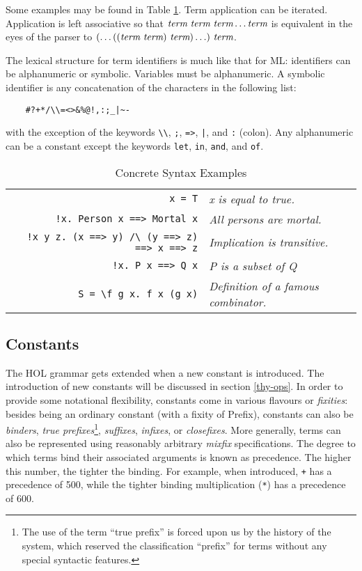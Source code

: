 {Some examples may be found in Table \ref{syntaxExamples}. Term
application can be iterated. Application is left associative so that
$\mbox{\it term}\ \mbox{\it term}\ \mbox{\it term} \ldots \mbox{\it term}$ is equivalent in the eyes of the
parser to $(\ldots((\term\ \term)\ \term) \ldots)\ \term$.

The lexical structure for term identifiers is much like that for
ML: identifiers can be alphanumeric or symbolic. Variables must be
alphanumeric. A symbolic identifier is any concatenation of the characters
in the following list:
\begin{verbatim}
    #?+*/\\=<>&%@!,:;_|~-
\end{verbatim}
with the exception of the keywords \verb+\\+, \verb+;+, \verb+=>+,
\verb+|+, and \verb+:+ (colon). Any alphanumeric can be a constant except the
keywords \verb+let+, \verb+in+, \verb+and+, and \verb+of+.

 \begin{table}[h]
\begin{center}
 \begin{tabular}{|r|l|} \hline
 \verb+x = T+ & {\it x is equal to true.} \\
 \verb+!x. Person x ==> Mortal x+ & {\it All persons are mortal.} \\
 \verb+!x y z. (x ==> y) /\ (y ==> z) ==> x ==> z+ & {\it Implication is
 transitive.} \\
 \verb+!x. P x ==> Q x+ & {\it P is a subset of Q} \\
 \verb+S = \f g x. f x (g x)+ & {\it Definition of a famous combinator.} \\ \hline
 \end{tabular}
 \caption{Concrete Syntax Examples}\label{syntaxExamples}
\end{center}
 \end{table}


\subsection{Constants}

The HOL grammar gets extended when a new constant is introduced. The
introduction of new constants will be discussed in section
\ref{thy-ops}. In order to provide some notational flexibility,
constants come in various flavours or {\it fixities}: besides being an
ordinary constant (with a fixity of {\sf Prefix}), constants can also
be {\it binders}, {\it true prefixes}\footnote{The use of the term
  ``true prefix'' is forced upon us by the history of the system,
  which reserved the classification ``prefix'' for terms without any
  special syntactic features.}, {\it suffixes}, {\it infixes}, or {\it
  closefixes}.  More generally, terms can also be represented using
reasonably arbitrary {\it mixfix} specifications.  The degree to which
terms bind their associated arguments is known as precedence.  The
higher this number, the tighter the binding.  For example, when
introduced, \verb-+- has a precedence of 500, while the tighter
binding multiplication (\verb+*+) has a precedence of 600.

}
